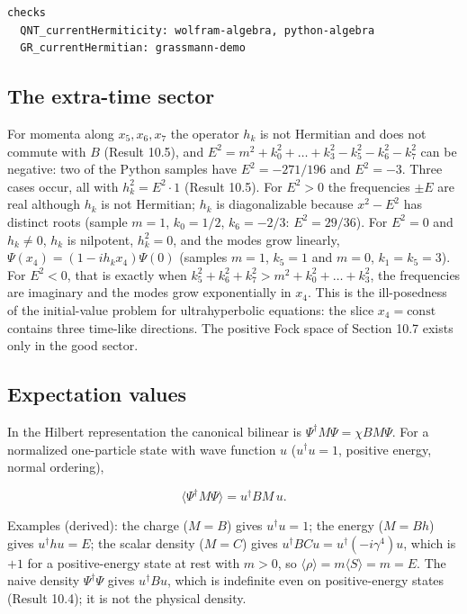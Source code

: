 \documentclass[11pt]{article}
\begin{document}
\begin{Verbatim}[fontsize=\small]
checks
  QNT_currentHermiticity: wolfram-algebra, python-algebra
  GR_currentHermitian: grassmann-demo
\end{Verbatim}

\subsection{The extra-time sector}

For momenta along $x_5,x_6,x_7$ the operator $h_k$ is not Hermitian and does not commute with $B$ (Result 10.5), and $E^2=m^2+k_0^2+\dots+k_3^2-k_5^2-k_6^2-k_7^2$ can be negative: two of the Python samples have $E^2=-271/196$ and $E^2=-3$. Three cases occur, all with $h_k^2=E^2\cdot1$ (Result 10.5). For $E^2>0$ the frequencies $\pm E$ are real although $h_k$ is not Hermitian; $h_k$ is diagonalizable because $x^2-E^2$ has distinct roots (sample $m=1$, $k_0=1/2$, $k_6=-2/3$: $E^2=29/36$). For $E^2=0$ and $h_k\ne0$, $h_k$ is nilpotent, $h_k^2=0$, and the modes grow linearly, $\Psi(x_4)=(1-ih_kx_4)\Psi(0)$ (samples $m=1$, $k_5=1$ and $m=0$, $k_1=k_5=3$). For $E^2<0$, that is exactly when $k_5^2+k_6^2+k_7^2>m^2+k_0^2+\dots+k_3^2$, the frequencies are imaginary and the modes grow exponentially in $x_4$. This is the ill-posedness of the initial-value problem for ultrahyperbolic equations: the slice $x_4=\text{const}$ contains three time-like directions. The positive Fock space of Section 10.7 exists only in the good sector.

\subsection{Expectation values}

In the Hilbert representation the canonical bilinear is $\Psi^\dagger M\Psi=\chi BM\Psi$. For a normalized one-particle state with wave function $u$ ($u^\dagger u=1$, positive energy, normal ordering),

\[
\bigl\langle\Psi^\dagger M\Psi\bigr\rangle=u^\dagger BM\,u .
\]

Examples (derived): the charge ($M=B$) gives $u^\dagger u=1$; the energy ($M=Bh$) gives $u^\dagger h u=E$; the scalar density ($M=C$) gives $u^\dagger BCu=u^\dagger(-i\gamma^4)u$, which is $+1$ for a positive-energy state at rest with $m>0$, so $\langle\rho\rangle=m\langle S\rangle=m=E$. The naive density $\Psi^\dagger\Psi$ gives $u^\dagger Bu$, which is indefinite even on positive-energy states (Result 10.4); it is not the physical density.
\end{document}

